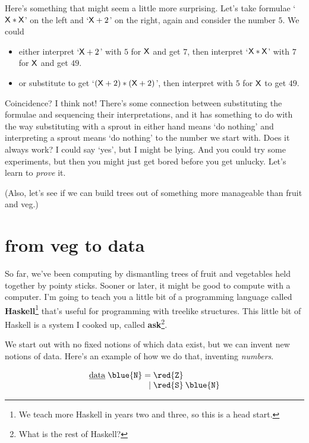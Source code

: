 \documentclass{book}
\newcommand{\D}[1]{\blue{\mathtt{#1}}}
\newcommand{\C}[1]{\red{\mathtt{#1}}}
\newcommand{\K}[1]{\underline{\mathrm{#1}}}
\begin{document}
Here's something that might seem a little more surprising. Let's take formulae `$\mathsf{X}*\mathsf{X}$' on the left and `$\mathsf{X}+2$' on the right, again and consider the number $5$. We could
\begin{itemize}
\item either interpret `$\mathsf{X}+2$' with $5$ for $\mathsf{X}$ and get $7$, then interpret `$\mathsf{X}*\mathsf{X}$' with $7$ for $\mathsf{X}$ and get $49$.
\item or substitute to get `$(\mathsf{X}+2)*(\mathsf{X}+2)$', then interpret with $5$ for $\mathsf{X}$ to get $49$.
\end{itemize}
Coincidence? I think not! There's some connection between substituting the formulae and sequencing their interpretations, and it has something to do with the way substituting with a sprout in either hand means `do nothing' and interpreting a sprout means `do nothing' to the number we start with. Does it always work? I could say `yes', but I might be lying. And you could try some experiments, but then you might just get bored before you get unlucky. Let's learn to \emph{prove} it.

(Also, let's see if we can build trees out of something more manageable than fruit and veg.)


\chapter{from veg to data}

So far, we've been computing by dismantling trees of fruit and vegetables held together by pointy sticks. Sooner or later, it might be good to compute with a computer. I'm going to teach you a little bit of a programming language called \textbf{Haskell}\footnote{We teach more Haskell in years two and three, so this is a head start.} that's useful for programming with treelike structures. This little bit of Haskell is a system I cooked up, called \textbf{ask}\footnote{What is the rest of Haskell?}.

We start out with no fixed notions of which data exist, but we can invent new notions of data. Here's an example of how we do that, inventing \emph{numbers}.

\[\begin{array}{r@{\;}r@{\;}l}
\K{data}\;\D{N}& = & \C{Z} \\
               & | & \C{S}\:\D{N}
\end{array}\]
\end{document}
